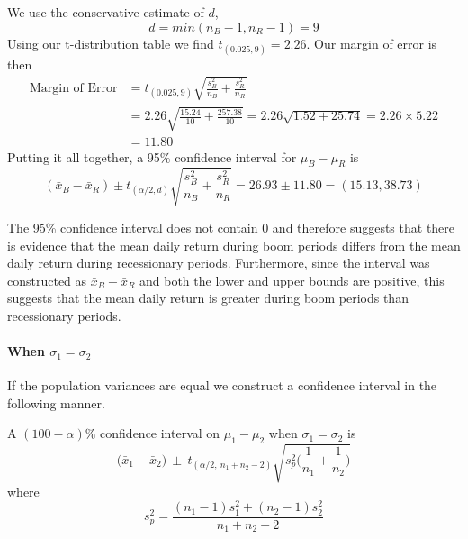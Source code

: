 \begin{example}
We use the conservative estimate of $d$,
\[ d= min(n_B-1,n_R-1) = 9 \]
Using our t-distribution table we find $t_{(0.025, 9)} = 2.26$. Our margin of error is then
\begin{align*}
\text{Margin of Error} &= t_{(0.025, 9)} \sqrt{\frac{s_B^2}{n_B}+\frac{s_R^2}{n_R}} \\
&= 2.26 \sqrt{ \frac{15.24}{10}+\frac{257.38}{10}} = 2.26 \sqrt{1.52+25.74} = 2.26 \times 5.22 \\
&= 11.80
\end{align*}
Putting it all together, a 95\% confidence interval for $\mu_B-\mu_R$ is
\[ (\bar{x}_B - \bar{x}_R) \pm t_{(\alpha/2,d)} \sqrt{\frac{s_B^2}{n_B} + \frac{s_R^2}{n_R}} = 26.93 \pm 11.80 = (15.13,38.73)\]

The 95\% confidence interval does not contain 0 and therefore suggests that there is evidence that the mean daily return during boom periods differs from the mean daily return during recessionary periods. Furthermore, since the interval was constructed as $\bar{x}_B - \bar{x}_R$ and both the lower and upper bounds are positive, this suggests that the mean daily return is greater during boom periods than recessionary periods. 

\end{example}


\paragraph{When $\sigma_{1} = \sigma_{2}$}

\noindent
If the population variances are equal we construct 
a confidence interval in the following manner.

\begin{ci}[Confidence Interval on $\mu_{1} - \mu_{2}$ when $\sigma_{1} = \sigma_{2}$]
\label{ciOnDiffMeanSigmasNotEqual}
A $(100 - \alpha)\%$ confidence interval on $\mu_{1} - \mu_{2}$ when $\sigma_{1} = \sigma_{2}$ is 
\begin{equation}
\big(\bar{x}_{1}	 - \bar{x}_{2}\big)	~\pm~		t_{(\alpha / 2, ~n_{1}+n_{2}-2)}  
 \displaystyle \sqrt{ s_{p}^{2} \bigg( \frac{1}{n_{1}}  +  \frac{1}{n_{2}}  \bigg) }
\end{equation}
where
\begin{equation}\label{equationPoolSampleVariance}
s_{p}^{2} =  \frac{ (n_{1} - 1) s_{1}^{2} + (n_{2} - 1) s_{2}^{2} }{ n_{1} + n_{2} - 2 }
\end{equation}
\end{ci}

